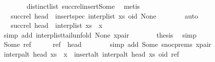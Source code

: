\begin{isabellebody}
\ \ \ \ \ \ \isamarkupfalse%
\ distinct{\isacharunderscore}list\ succ{\isacharunderscore}rel{\isacharunderscore}insert{\isacharunderscore}Some\ \isamarkupfalse%
\ metis\isanewline
\ \ \ \ \isamarkupfalse%
\ \isamarkupfalse%
\ {\isachardoublequoteopen}{\isachardot}{\isachardot}{\isachardot}\ {\isacharequal}\ succ{\isacharunderscore}rel\ {\isacharparenleft}head\ {\isacharhash}\ {\isacharparenleft}insert{\isacharunderscore}spec\ {\isacharparenleft}interp{\isacharunderscore}list\ xs{\isacharparenright}\ {\isacharparenleft}oid{\isacharcomma}\ None{\isacharparenright}{\isacharparenright}{\isacharparenright}{\isachardoublequoteclose}\isanewline
\ \ \ \ \ \ \isamarkupfalse%
\ auto\isanewline
\ \ \ \ \isamarkupfalse%
\ \isamarkupfalse%
\ {\isachardoublequoteopen}{\isachardot}{\isachardot}{\isachardot}\ {\isacharequal}\ succ{\isacharunderscore}rel\ {\isacharparenleft}head\ {\isacharhash}\ {\isacharparenleft}interp{\isacharunderscore}list\ {\isacharparenleft}xs\ {\isacharat}\ {\isacharbrackleft}x{\isacharbrackright}{\isacharparenright}{\isacharparenright}{\isacharparenright}{\isachardoublequoteclose}\isanewline
\ \ \ \ \ \ \isamarkupfalse%
\ {\isacharparenleft}simp\ add{\isacharcolon}\ interp{\isacharunderscore}list{\isacharunderscore}tail{\isacharunderscore}unfold\ None\ x{\isacharunderscore}pair{\isacharparenright}\isanewline
\ \ \ \ \isamarkupfalse%
\ \isamarkupfalse%
\ {\isacharquery}thesis\ \isamarkupfalse%
\ simp\isanewline
\ \ \isamarkupfalse%
\isanewline
\ \ \ \ \isamarkupfalse%
\ {\isacharparenleft}Some\ ref{\isacharparenright}\isanewline
\ \ \ \ \isamarkupfalse%
\ {\isachardoublequoteopen}ref\ {\isasymnoteq}\ head{\isachardoublequoteclose}\isanewline
\ \ \ \ \ \ \isamarkupfalse%
\ {\isacharparenleft}simp\ add{\isacharcolon}\ Some\ snoc{\isachardot}prems{\isacharparenleft}{}{\isacharparenright}\ x{\isacharunderscore}pair{\isacharparenright}\isanewline
\ \ \ \ \isamarkupfalse%
\ {\isachardoublequoteopen}interp{\isacharunderscore}alt\ head\ {\isacharparenleft}xs\ {\isacharat}\ {\isacharbrackleft}x{\isacharbrackright}{\isacharparenright}\ {\isacharequal}\ insert{\isacharunderscore}alt\ {\isacharparenleft}interp{\isacharunderscore}alt\ head\ xs{\isacharparenright}\ {\isacharparenleft}oid{\isacharcomma}\ ref{\isacharparenright}{\isachardoublequoteclose}\isanewline
\ \ \ \ \ \ \isamarkupfalse%

\end{isabellebody}
